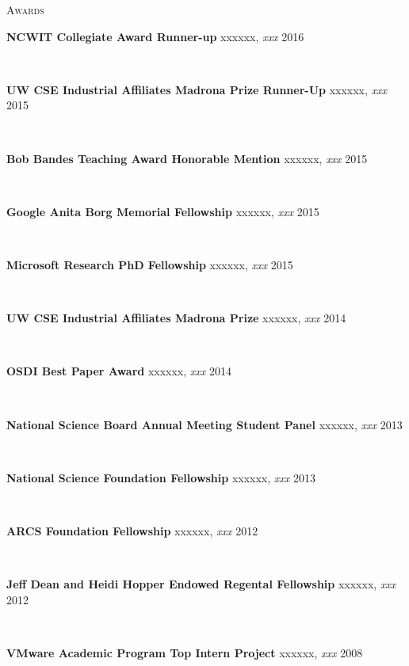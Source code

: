 \documentclass[10pt,times]{report}
\newlength{\sectiongap}
\newlength{\entrygap}
\newlength{\sectioncolwidth}
\newlength{\colgap}
\newlength{\stuffwidth}
\def\ifEqString#1#2{\def\testa{#1}\def\testb{#2}%
  \ifx\testa\testb}
\newenvironment{rtable}{
  \begin{minipage}{\textwidth}
  }{
  \end{minipage}
}
\newenvironment{rentry}[3][xxx]{
  \begin{minipage}[t]{\hsize}
    \textbf{#2}\ifEqString{#1}{xxx}\relax\else, \textit{#1}\fi
    \hspace{\stretch{1}} #3 \\
  }{
    \removelastskip
  \end{minipage}
  \\[\entrygap]  %
}
\newenvironment{rsection}[1]{
  \begin{minipage}[t]{\sectioncolwidth}
    \textsc{#1}
  \end{minipage}
  \hspace{\colgap}
  \begin{minipage}[t]{\stuffwidth}
  }{
    \removelastskip
  \end{minipage}
  \\[\sectiongap]
}
\begin{document}
\begin{rtable}
  \begin{rsection}{Awards}
    \begin{rentry}{NCWIT Collegiate Award Runner-up}{2016}
      \vspace{-0.5em}
    \end{rentry} 
    \begin{rentry}{UW CSE Industrial Affiliates Madrona Prize Runner-Up}{2015}
      \vspace{-0.5em}
    \end{rentry} 
    \begin{rentry}{Bob Bandes Teaching Award Honorable Mention}{2015}
      \vspace{-0.5em}
    \end{rentry} 
    \begin{rentry}{Google Anita Borg Memorial Fellowship}{2015}
      \vspace{-0.5em}
    \end{rentry} 
    \begin{rentry}{Microsoft Research PhD Fellowship}{2015}
      \vspace{-0.5em}
    \end{rentry} 
    \begin{rentry}{UW CSE Industrial Affiliates Madrona Prize}{2014}
       \vspace{-0.5em}
    \end{rentry}
    \begin{rentry}{OSDI Best Paper Award}{2014}
      \vspace{-0.5em}
    \end{rentry}
    \begin{rentry}{National Science Board Annual Meeting Student
        Panel}{2013}
      \vspace{-0.5em}
    \end{rentry}
    \begin{rentry}{National Science Foundation Fellowship}{2013}
      \vspace{-0.5em}
    \end{rentry}
    \begin{rentry}{ARCS Foundation Fellowship}{2012}
       \vspace{-0.5em}
    \end{rentry}
    \begin{rentry}{Jeff Dean and Heidi Hopper Endowed Regental Fellowship}{2012}
       \vspace{-0.5em}
    \end{rentry}
    \begin{rentry}{VMware Academic Program Top Intern Project}{2008}

\end{rentry}
\end{rsection}
\end{rtable}
\end{document}
